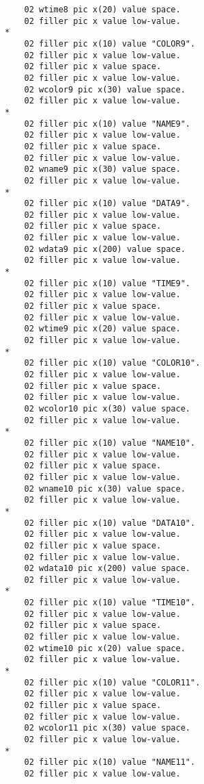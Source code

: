 {{{\begin{verbatim}
          02 wtime8 pic x(20) value space.
          02 filler pic x value low-value.
      *    
          02 filler pic x(10) value "COLOR9".
          02 filler pic x value low-value.
          02 filler pic x value space.
          02 filler pic x value low-value.
          02 wcolor9 pic x(30) value space.
          02 filler pic x value low-value.
      *    
          02 filler pic x(10) value "NAME9".
          02 filler pic x value low-value.
          02 filler pic x value space.
          02 filler pic x value low-value.
          02 wname9 pic x(30) value space.
          02 filler pic x value low-value.
      *    
          02 filler pic x(10) value "DATA9".
          02 filler pic x value low-value.
          02 filler pic x value space.
          02 filler pic x value low-value.
          02 wdata9 pic x(200) value space.
          02 filler pic x value low-value.
      *    
          02 filler pic x(10) value "TIME9".
          02 filler pic x value low-value.
          02 filler pic x value space.
          02 filler pic x value low-value.
          02 wtime9 pic x(20) value space.
          02 filler pic x value low-value.
      *    
          02 filler pic x(10) value "COLOR10".
          02 filler pic x value low-value.
          02 filler pic x value space.
          02 filler pic x value low-value.
          02 wcolor10 pic x(30) value space.
          02 filler pic x value low-value.
      *    
          02 filler pic x(10) value "NAME10".
          02 filler pic x value low-value.
          02 filler pic x value space.
          02 filler pic x value low-value.
          02 wname10 pic x(30) value space.
          02 filler pic x value low-value.
      *    
          02 filler pic x(10) value "DATA10".
          02 filler pic x value low-value.
          02 filler pic x value space.
          02 filler pic x value low-value.
          02 wdata10 pic x(200) value space.
          02 filler pic x value low-value.
      *    
          02 filler pic x(10) value "TIME10".
          02 filler pic x value low-value.
          02 filler pic x value space.
          02 filler pic x value low-value.
          02 wtime10 pic x(20) value space.
          02 filler pic x value low-value.
      *    
          02 filler pic x(10) value "COLOR11".
          02 filler pic x value low-value.
          02 filler pic x value space.
          02 filler pic x value low-value.
          02 wcolor11 pic x(30) value space.
          02 filler pic x value low-value.
      *    
          02 filler pic x(10) value "NAME11".
          02 filler pic x value low-value.

\end{verbatim}}}}
